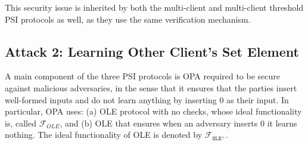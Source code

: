    This security issue is inherited by both   the multi-client  and multi-client threshold PSI protocols as well, as they use the same verification mechanism. 
   
   





\subsection{Attack 2: Learning Other Client's Set Element}

 A main component of the three PSI protocols is OPA  required  to be secure against malicious adversaries, in the sense that it ensures that the parties insert well-formed inputs and do not learn anything by inserting $0$ as their input.  In particular, OPA uses:  (a) OLE protocol with no checks, whose ideal functionality is, called $\mathcal{F}_{\scriptscriptstyle OLE}$, and (b)  OLE that ensures when an adversary inserts $0$ it learns nothing. The ideal functionality of OLE  is denoted by  $ \mathcal{F}_{\mathtt{OLE}^{\scriptscriptstyle +}}$. 




